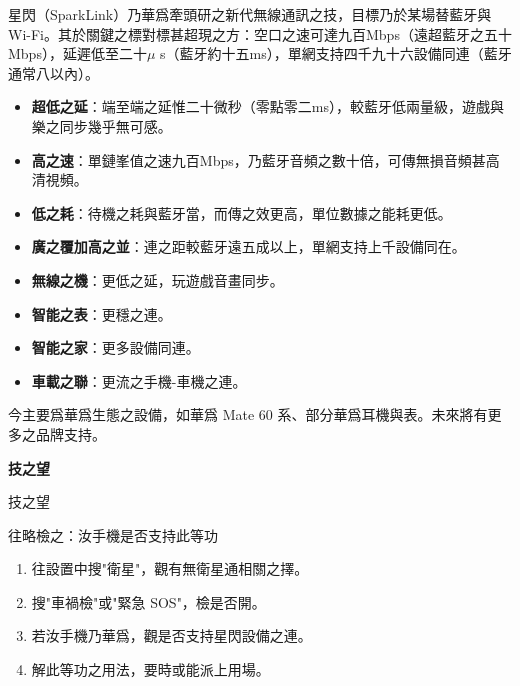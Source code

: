 
星閃（SparkLink）乃華爲牽頭研之新代無線通訊之技，目標乃於某場替藍牙與Wi-Fi。其於關鍵之標對標甚超現之方：空口之速可達九百Mbps（遠超藍牙之五十Mbps），延遲低至二十$\mu$ s（藍牙約十五ms），單網支持四千九十六設備同連（藍牙通常八以內）。


\begin{itemize}
  \item \textbf{超低之延}：端至端之延惟二十微秒（零點零二ms），較藍牙低兩量級，遊戲與樂之同步幾乎無可感。
  \item \textbf{高之速}：單鏈峯值之速九百Mbps，乃藍牙音頻之數十倍，可傳無損音頻甚高清視頻。
  \item \textbf{低之耗}：待機之耗與藍牙當，而傳之效更高，單位數據之能耗更低。
  \item \textbf{廣之覆加高之並}：連之距較藍牙遠五成以上，單網支持上千設備同在。
\end{itemize}


\begin{itemize}
  \item \textbf{無線之機}：更低之延，玩遊戲音畫同步。
  \item \textbf{智能之表}：更穩之連。
  \item \textbf{智能之家}：更多設備同連。
  \item \textbf{車載之聯}：更流之手機-車機之連。
\end{itemize}


今主要爲華爲生態之設備，如華爲 Mate 60 系、部分華爲耳機與表。未來將有更多之品牌支持。

\textbf{技之望}\par

技之望

\begin{tcbpractice}{往略檢之：汝手機是否支持此等功}
\begin{enumerate}
  \item 往設置中搜"衛星"，觀有無衛星通相關之擇。
  \item 搜"車禍檢"或"緊急 SOS"，檢是否開。
  \item 若汝手機乃華爲，觀是否支持星閃設備之連。
  \item 解此等功之用法，要時或能派上用場。
\end{enumerate}

\end{tcbpractice}
